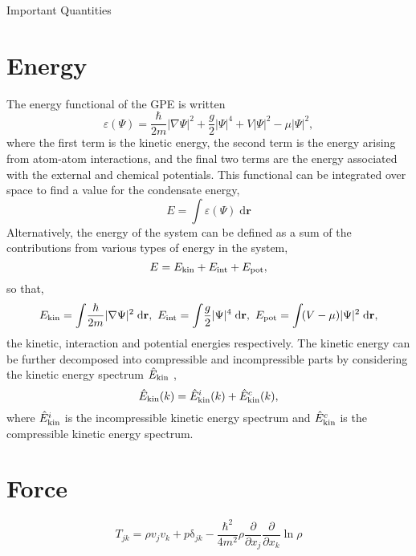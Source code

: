 \begin{chapter}{Important Quantities\label{app:ImpQuantities}}
\section{\label{appsection:energy} Energy}
The energy functional of the GPE is written
\begin{equation}
\varepsilon(\Psi) = \frac{\hbar}{2m}|\nabla\Psi|^2 + \frac{g}{2}|\Psi|^4 + V|\Psi|^2 - \mu|\Psi|^2,
\label{eq:Efn}
\end{equation}
where the first term is the kinetic energy, the second term is the energy arising from atom-atom interactions, and the final two terms are the energy associated with the external and chemical potentials. This functional can be integrated over space to find a value for the condensate energy,
\begin{equation}
E = \int\!\varepsilon(\Psi)\;\mathrm{d}\mathbf{r}
\label{eq:Efn}
\end{equation}
Alternatively, the energy of the system can be defined as a sum of the contributions from various types of energy in the system,
\begin{equation}
E = E_{\rm kin} + E_{\rm int} + E_{\mathrm{pot}},
\label{eq:Esplit}
\end{equation}
so that,
\begin{equation}
E_{\rm kin} = \int\!\frac{\hbar}{2m}|\nabla\Psi|^2\;\mathrm{d}\mathbf{r},~E_{\rm int}=\int\!\frac{g}{2}|\Psi|^4\;\mathrm{d}\mathbf{r},~E_{\mathrm{pot}}=\int\!(V-\mu)|\Psi|^2\;\mathrm{d}\mathbf{r},
\label{eq:Esplitdef}
\end{equation}
the kinetic, interaction and potential energies respectively. The kinetic energy can be further decomposed into compressible and incompressible parts by considering the kinetic energy spectrum $\hat{E}_{\rm kin}$ \cite{Nore},
\begin{equation}
\hat{E}_{\rm kin}(k) = \hat{E}^i_{\rm kin}(k) + \hat{E}^c_{\rm kin}(k),
\label{eq:Esplitdef}
\end{equation}
where $\hat{E}^i_{\rm kin}$ is the incompressible kinetic energy spectrum and $\hat{E}^c_{\rm kin}$ is the compressible kinetic energy spectrum.

\section{\label{appsection:force} Force}

\begin{equation}
T_{jk} = \rho v_j v_k + p\mathrm{\delta}_{jk} - \frac{\hbar^2}{4m^2}\rho \frac{\partial}{\partial x_j}\frac{\partial}{\partial x_k} \ln \rho
\label{eq:stressTensor}
\end{equation}


\end{chapter}
